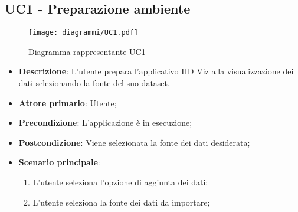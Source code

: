 \subsection{UC1 - Preparazione ambiente}
\label{sub:uc1}


\begin{figure}[h]
    \centering
    \texttt{[image: diagrammi/UC1.pdf]}
    \caption{Diagramma rappresentante UC1}
    \label{fig:UC1}
\end{figure}


\begin{itemize}
    \item \textbf{Descrizione}: L'utente prepara l'applicativo HD Viz alla visualizzazione dei dati selezionando la fonte del suo dataset.
	
    \item \textbf{Attore primario}: Utente;
        
    \item \textbf{Precondizione}:   L'applicazione è in esecuzione;

    \item \textbf{Postcondizione}:  Viene selezionata la fonte dei dati desiderata;

	\item \textbf{Scenario principale}:
		\begin{enumerate}
			\item L'utente seleziona l'opzione di aggiunta dei dati;
            \item L'utente seleziona la fonte dei dati da importare;
        \end{enumerate}
   
\end{itemize}

